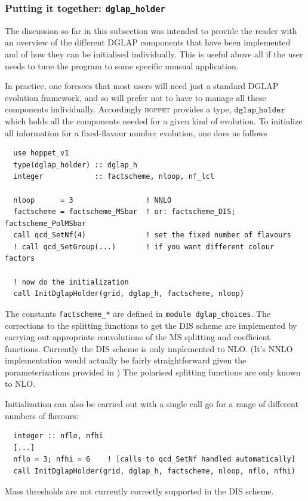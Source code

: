 \documentclass[12pt]{article}
\newcommand{\MSbar}{\overline{\mathrm{MS}}}
\newcommand{\hoppet}{\textsc{hoppet}\xspace}
\newcommand{\ttt}[1]{\texttt{#1}}
\begin{document}
\subsubsection{Putting it together: \ttt{dglap\_holder}}

The discussion so far in this subsection was intended to provide the
reader with an overview of the different DGLAP components that have
been implemented and of how they can be initialised individually. This
is useful above all if the user needs to tune the program to some
specific unusual application.

In practice, one foresees that most users will need just a standard
DGLAP evolution framework, and so will prefer not to have to manage
all these components individually. Accordingly \hoppet provides a
type, $\ttt{dglap\_holder}$ which holds all the components needed for
a given kind of evolution. To initialize all information for a
fixed-flavour number evolution, one does as follows
%
\begin{verbatim}
  use hoppet_v1
  type(dglap_holder) :: dglap_h
  integer            :: factscheme, nloop, nf_lcl  

  nloop      = 3                 ! NNLO
  factscheme = factscheme_MSbar  ! or: factscheme_DIS; factscheme_PolMSbar
  call qcd_SetNf(4)              ! set the fixed number of flavours
  ! call qcd_SetGroup(...)       ! if you want different colour factors

  ! now do the initialization
  call InitDglapHolder(grid, dglap_h, factscheme, nloop)
\end{verbatim}
The constants \ttt{factscheme\_*} are defined in \ttt{module
  dglap\_choices}. %
The corrections to the splitting functions to get the DIS scheme are
implemented by carrying out appropriate convolutions of the $\MSbar$
splitting and coefficient functions. Currently the DIS scheme is only
implemented to NLO. (It's NNLO implementation would actually be fairly
straightforward given the parameterizations provided in
\cite{White:2005wm}) The polarised splitting functions are only known
to NLO.

Initialization can also be carried out with a single call go for a range of
different numbers of flavours:
\begin{verbatim}
  integer :: nflo, nfhi
  [...]
  nflo = 3; nfhi = 6    ! [calls to qcd_SetNf handled automatically]
  call InitDglapHolder(grid, dglap_h, factscheme, nloop, nflo, nfhi)
\end{verbatim}
Mass thresholds are not currently correctly supported in the DIS
scheme.
\end{document}
